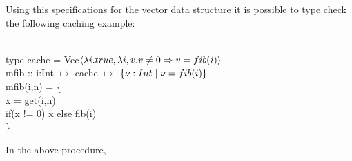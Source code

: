 %
Using this specifications for the vector data structure it is possible 
to type check the following caching example:
%
\begin{myprogram}
\\
\pnl type cache = Vec$\left< \lambda i. true, \lambda i,v. v \ne 0 \Rightarrow v = fib(i) \right>$ \\
\pnl mfib :: i:Int $\mapsto$ cache $\mapsto$ $\{ \nu: Int \; | \; \nu = fib(i) \}$ \\
\pnl mfib(i,n) = \{  \\
\pnl \> x = get(i,n) \\
\pnl \> if(x != 0) x else fib(i) \\
\pnl \} 
\end{myprogram}
%
In the above procedure,